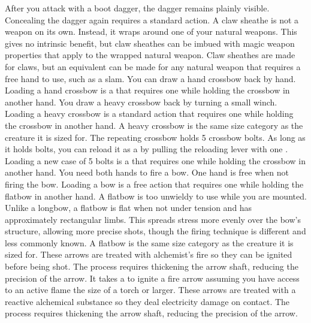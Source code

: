         After you attack with a boot dagger, the dagger remains plainly visible.
        Concealing the dagger again requires a standard action.
         A claw sheathe is not a weapon on its own.
        Instead, it wraps around one of your natural weapons.
        This gives no intrinsic benefit, but claw sheathes can be imbued with magic weapon properties that apply to the wrapped natural weapon.
        Claw sheathes are made for claws, but an equivalent can be made for any natural weapon that requires a free hand to use, such as a slam.
         You can draw a hand crossbow back by hand. Loading a hand crossbow is a  that requires one  while holding the crossbow in another hand.
         You draw a heavy crossbow back by turning a small winch.
        Loading a heavy crossbow is a standard action that requires one  while holding the crossbow in another hand.
        A heavy crossbow is the same size category as the creature it is sized for.
         The repeating crossbow holds 5 crossbow bolts. As long as it holds bolts, you can reload it as a  by pulling the reloading lever with one . Loading a new case of 5 bolts is a  that requires one  while holding the crossbow in another hand.
         You need both hands to fire a bow. One hand is free when not firing the bow. Loading a bow is a free action that requires one  while holding the flatbow in another hand. A flatbow is too unwieldy to use while you are mounted.
        Unlike a longbow, a flatbow is flat when not under tension and has approximately rectangular limbs.
        This spreads stress more evenly over the bow's structure, allowing more precise shots, though the firing technique is different and less commonly known.
        A flatbow is the same size category as the creature it is sized for.
         These arrows are treated with alchemist's fire so they can be ignited before being shot.
        The process requires thickening the arrow shaft, reducing the precision of the arrow.
        It takes a  to ignite a fire arrow assuming you have access to an active flame the size of a torch or larger.
         These arrows are treated with a reactive alchemical substance so they deal electricity damage on contact.
        The process requires thickening the arrow shaft, reducing the precision of the arrow.
